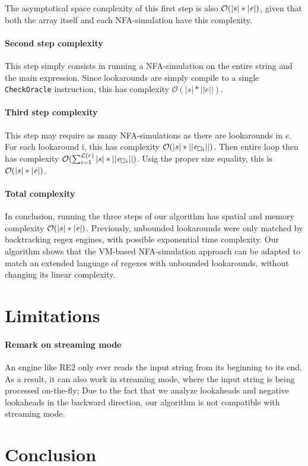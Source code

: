 \documentclass{article}
\def\bytecode#1{\lstinline[style=byt]{#1}}
\def\size#1{\ensuremath{|#1|}}
\def\psize#1{\ensuremath{||#1||}}
\def\looknb#1{\ensuremath{\mathcal{L}(#1)}}
\def\bigo{\ensuremath{\mathcal{O}}}
\begin{document}
The asymptotical space complexity of this first step is also $\bigo(\size{s} * \size{\re})$, given that both the array itself and each NFA-simulation have this complexity.

\paragraph{Second step complexity}
This step simply consists in running a NFA-simulation on the entire string and the main expression.
Since lookarounds are simply compile to a single \bytecode{CheckOracle} instruction, this has complexity $\bigo(\size{s} * \psize{e})$.

\paragraph{Third step complexity}
This step may require as many NFA-simulations as there are lookarounds in $e$.
For each lookaround i, this has complexity $\bigo(\size{s} * \psize{\re_{\Box i}})$.
Then entire loop then has complexity $\bigo(\sum_{i=1}^{\looknb{r}} \size{s} * \psize{\re_{\Box i}})$.
Usig the proper size equality, this is $\bigo(\size{s} * \size{\re})$.

\paragraph{Total complexity}
In conclusion, running the three steps of our algorithm has spatial and memory complexity $\bigo(\size{s} * \size{\re})$.
Previously, unbounded lookarounds were only matched by backtracking regex engines, with possible exponential time complexity.
Our algorithm shows that the VM-based NFA-simulation approach can be adapted to match an extended language of regexes with unbounded lookarounds, without changing its linear complexity.

\section{Limitations}

\paragraph{Remark on streaming mode}
An engine like RE2 only ever reads the input string from its beginning to its end.
As a result, it can also work in streaming mode, where the input string is being processed on-the-fly;
Due to the fact that we analyze lookaheads and negative lookaheads in the backward direction, our algorithm is not compatible with streaming mode.

\section{Conclusion}



\newpage

\end{document}
